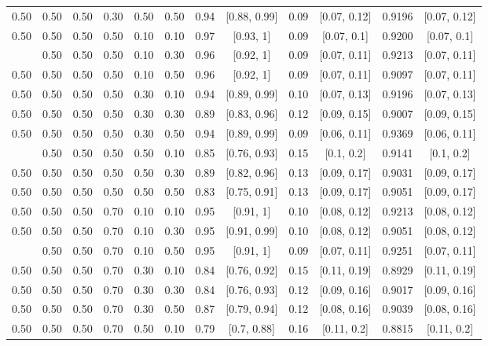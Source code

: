 \documentclass[
  11pt,
]{article}
\begin{document}
\begin{landscape}
\begin{ThreePartTable}
\begin{longtable}[t]{cccccccccccc}
0.50 & 0.50 & 0.50 & 0.30 & 0.50 & 0.50 & 0.94 & {}[0.88, 0.99] & 0.09 & {}[0.07, 0.12] & 0.9196 & {}[0.07, 0.12]\\
0.50 & 0.50 & 0.50 & 0.50 & 0.10 & 0.10 & 0.97 & {}[0.93, 1] & 0.09 & {}[0.07, 0.1] & 0.9200 & {}[0.07, 0.1]\\
\addlinespace
0.50 & 0.50 & 0.50 & 0.50 & 0.10 & 0.30 & 0.96 & {}[0.92, 1] & 0.09 & {}[0.07, 0.11] & 0.9213 & {}[0.07, 0.11]\\
0.50 & 0.50 & 0.50 & 0.50 & 0.10 & 0.50 & 0.96 & {}[0.92, 1] & 0.09 & {}[0.07, 0.11] & 0.9097 & {}[0.07, 0.11]\\
0.50 & 0.50 & 0.50 & 0.50 & 0.30 & 0.10 & 0.94 & {}[0.89, 0.99] & 0.10 & {}[0.07, 0.13] & 0.9196 & {}[0.07, 0.13]\\
0.50 & 0.50 & 0.50 & 0.50 & 0.30 & 0.30 & 0.89 & {}[0.83, 0.96] & 0.12 & {}[0.09, 0.15] & 0.9007 & {}[0.09, 0.15]\\
0.50 & 0.50 & 0.50 & 0.50 & 0.30 & 0.50 & 0.94 & {}[0.89, 0.99] & 0.09 & {}[0.06, 0.11] & 0.9369 & {}[0.06, 0.11]\\
\addlinespace
0.50 & 0.50 & 0.50 & 0.50 & 0.50 & 0.10 & 0.85 & {}[0.76, 0.93] & 0.15 & {}[0.1, 0.2] & 0.9141 & {}[0.1, 0.2]\\
0.50 & 0.50 & 0.50 & 0.50 & 0.50 & 0.30 & 0.89 & {}[0.82, 0.96] & 0.13 & {}[0.09, 0.17] & 0.9031 & {}[0.09, 0.17]\\
0.50 & 0.50 & 0.50 & 0.50 & 0.50 & 0.50 & 0.83 & {}[0.75, 0.91] & 0.13 & {}[0.09, 0.17] & 0.9051 & {}[0.09, 0.17]\\
0.50 & 0.50 & 0.50 & 0.70 & 0.10 & 0.10 & 0.95 & {}[0.91, 1] & 0.10 & {}[0.08, 0.12] & 0.9213 & {}[0.08, 0.12]\\
0.50 & 0.50 & 0.50 & 0.70 & 0.10 & 0.30 & 0.95 & {}[0.91, 0.99] & 0.10 & {}[0.08, 0.12] & 0.9051 & {}[0.08, 0.12]\\
\addlinespace
0.50 & 0.50 & 0.50 & 0.70 & 0.10 & 0.50 & 0.95 & {}[0.91, 1] & 0.09 & {}[0.07, 0.11] & 0.9251 & {}[0.07, 0.11]\\
0.50 & 0.50 & 0.50 & 0.70 & 0.30 & 0.10 & 0.84 & {}[0.76, 0.92] & 0.15 & {}[0.11, 0.19] & 0.8929 & {}[0.11, 0.19]\\
0.50 & 0.50 & 0.50 & 0.70 & 0.30 & 0.30 & 0.84 & {}[0.76, 0.93] & 0.12 & {}[0.09, 0.16] & 0.9017 & {}[0.09, 0.16]\\
0.50 & 0.50 & 0.50 & 0.70 & 0.30 & 0.50 & 0.87 & {}[0.79, 0.94] & 0.12 & {}[0.08, 0.16] & 0.9039 & {}[0.08, 0.16]\\
0.50 & 0.50 & 0.50 & 0.70 & 0.50 & 0.10 & 0.79 & {}[0.7, 0.88] & 0.16 & {}[0.11, 0.2] & 0.8815 & {}[0.11, 0.2]\\

\end{longtable}
\end{ThreePartTable}
\end{landscape}
\end{document}
